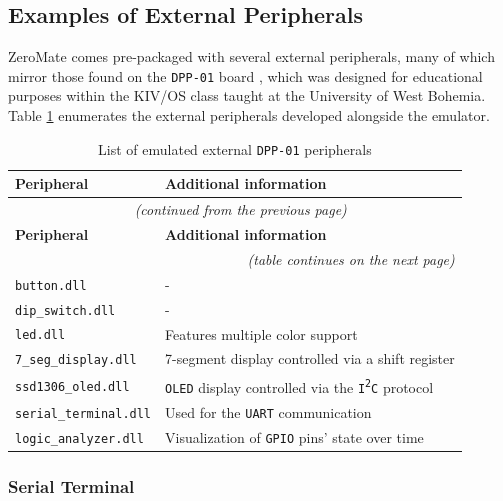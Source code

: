 \documentclass[english, ing, kiv, he, iso690numb, pdf]{fasthesis}
\begin{document}
	\subsection{Examples of External Peripherals}
	
	ZeroMate comes pre-packaged with several external peripherals, many of which mirror those found on the \texttt{DPP-01} board \cite{KIV-DPP-01}, which was designed for educational purposes within the KIV/OS class taught at the University of West Bohemia. Table \ref{List of emulated external DPP-01 peripherals} enumerates the external peripherals developed alongside the emulator.
	
	\begin{center}
		\begin{longtable}{p{}p{}}
			\caption{List of emulated external \texttt{DPP-01} peripherals}
			\label{List of emulated external DPP-01 peripherals}\\
			\toprule[1.5pt]
			\textbf{Peripheral} & \textbf{Additional information}\\
			\midrule
			\endfirsthead
			\multicolumn{2}{c}{\tablename{}~\thetable{} \textit{(continued from the previous page)}}\\
			\midrule
			\textbf{Peripheral} & \textbf{Additional information}\\
			\midrule
			\endhead
			\midrule
			\multicolumn{2}{r}{\textit{(table continues on the next page)}}\\
			\endfoot
			\bottomrule[1.5pt]
			\endlastfoot
			\texttt{button.dll} & -\\
			\texttt{dip\_switch.dll} & -\\
			\texttt{led.dll} & Features multiple color support\\
			\texttt{7\_seg\_display.dll} & 7-segment display controlled via a shift register\\
			\texttt{ssd1306\_oled.dll} & \texttt{OLED} display controlled via the \texttt{I\textsuperscript{2}C} protocol\\
			\midrule
			\texttt{serial\_terminal.dll} & Used for the \texttt{UART} communication\\
			\texttt{logic\_analyzer.dll} & Visualization of \texttt{GPIO} pins' state over time\\
		\end{longtable}
	\end{center}
	
	\newpage
	
	\subsubsection{Serial Terminal}
	
\end{document}
